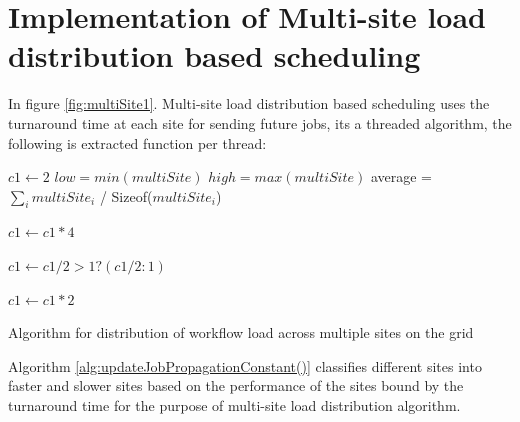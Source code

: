\documentclass[ms,electronic,double]{nuthesis}
\begin{document}
\section{Implementation of Multi-site load distribution based scheduling}
In figure \ref{fig:multiSite1}. Multi-site load distribution based scheduling uses the turnaround time at each 
site for sending future jobs, its a threaded algorithm, the following is extracted function per thread:

\begin{algorithm}
\begin{algorithmic}

\STATE $c1 \gets 2$ 
\STATE $low = min(multiSite)$
\STATE $high = max(multiSite)$
\STATE average = $\sum_i multiSite_i$ / Sizeof($multiSite_i$)

\STATE $c1 \gets c1 * 4$
\ENDIF

\STATE $c1 \gets c1/2>1 ? (c1/2:1)$
\ENDIF

\STATE $c1 \gets c1 * 2$
\ENDIF

\end{algorithmic}
\caption{Algorithm for distribution of workflow load across multiple sites on the grid}
\label{alg:updateJobPropagationConstant()}
\end{algorithm}

Algorithm \ref{alg:updateJobPropagationConstant()} classifies different sites 
into faster and slower sites based on the performance of the sites bound by the 
turnaround time for the purpose of multi-site load distribution algorithm.
\end{document}
